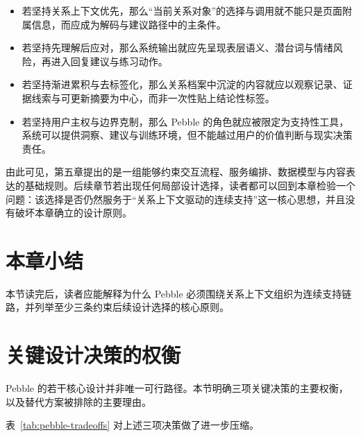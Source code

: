 \begin{itemize}
  \item 若坚持关系上下文优先，那么“当前关系对象”的选择与调用就不能只是页面附属信息，而应成为解码与建议路径中的主条件。
  \item 若坚持先理解后应对，那么系统输出就应先呈现表层语义、潜台词与情绪风险，再进入回复建议与练习动作。
  \item 若坚持渐进累积与去标签化，那么关系档案中沉淀的内容就应以观察记录、证据线索与可更新摘要为中心，而非一次性贴上结论性标签。
  \item 若坚持用户主权与边界克制，那么 Pebble 的角色就应被限定为支持性工具，系统可以提供洞察、建议与训练环境，但不能越过用户的价值判断与现实决策责任。
\end{itemize}

由此可见，第五章提出的是一组能够约束交互流程、服务编排、数据模型与内容表达的基础规则。后续章节若出现任何局部设计选择，读者都可以回到本章检验一个问题：该选择是否仍然服务于“关系上下文驱动的连续支持”这一核心思想，并且没有破坏本章确立的设计原则。

\section{本章小结}

本节读完后，读者应能解释为什么 Pebble 必须围绕关系上下文组织为连续支持链路，并列举至少三条约束后续设计选择的核心原则。


\section{关键设计决策的权衡}

Pebble 的若干核心设计并非唯一可行路径。本节明确三项关键决策的主要权衡，以及替代方案被排除的主要理由。

表~\ref{tab:pebble-tradeoffs} 对上述三项决策做了进一步压缩。


